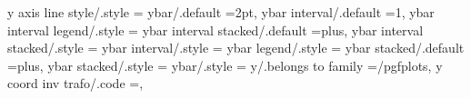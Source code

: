 y axis line style/.style                                           ={                                                                                                                                  
ybar/.default                                                      =2pt,                                                                                                                               
ybar interval/.default                                             =1,                                                                                                                                 
ybar interval legend/.style                                        ={                                                                                                                                  
ybar interval stacked/.default                                     =plus,                                                                                                                              
ybar interval stacked/.style                                       ={                                                                                                                                  
ybar interval/.style                                               ={%
ybar legend/.style                                                 ={                                                                                                                                  
ybar stacked/.default                                              =plus,                                                                                                                              
ybar stacked/.style                                                ={                                                                                                                                  
ybar/.style                                                        ={                                                                                                                                  
y/.belongs to family                                               =/pgfplots,                                                                                                                         
y coord inv trafo/.code                                            ={},                                                                                                                                
}}}}}}}

